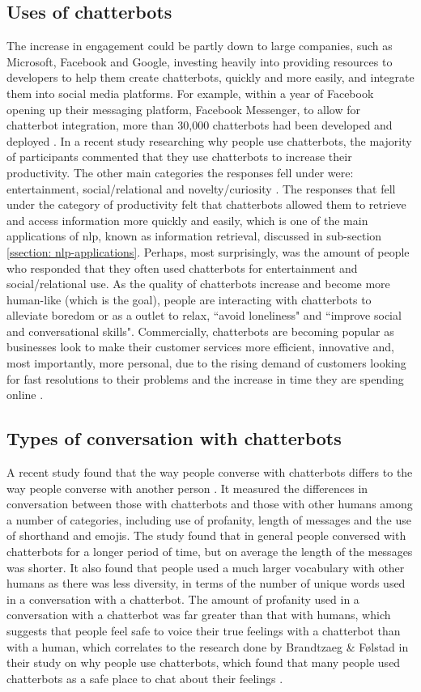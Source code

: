 \subsection{Uses of chatterbots}
The increase in engagement could be partly down to large companies, such as Microsoft, Facebook and Google, investing heavily into providing resources to developers to help them create chatterbots, quickly and more easily, and integrate them into social media platforms. For example, within a year of Facebook opening up their messaging platform, Facebook Messenger, to allow for chatterbot integration, more than 30,000 chatterbots had been developed and deployed \autocite{why-people-use-chatbots2017}. In a recent study researching why people use chatterbots, the majority of participants commented that they use chatterbots to increase their productivity. The other main categories the responses fell under were: entertainment, social/relational and novelty/curiosity \autocite{why-people-use-chatbots2017}. The responses that fell under the category of productivity felt that chatterbots allowed them to retrieve and access information more quickly and easily, which is one of the main applications of \gls{nlp}, known as information retrieval, discussed in sub-section \ref{ssection: nlp-applications}. Perhaps, most surprisingly, was the amount of people who responded that they often used chatterbots for entertainment and social/relational use. As the quality of chatterbots increase and become more human-like (which is the goal), people are interacting with chatterbots to alleviate boredom or as a outlet to relax, ``avoid loneliness" and ``improve social and conversational skills". Commercially, chatterbots are becoming popular as businesses look to make their customer services more efficient, innovative and, most importantly, more personal, due to the rising demand of customers looking for fast resolutions to their problems and the increase in time they are spending online \autocite{deloitte-chatbots2018}.
\subsection{Types of conversation with chatterbots}
A recent study found that the way people converse with chatterbots differs to the way people converse with another person \autocite{hill2015real}. It measured the differences in conversation between those with chatterbots and those with other humans among a number of categories, including use of profanity, length of messages and the use of shorthand and emojis. The study found that in general people conversed with chatterbots for a longer period of time, but on average the length of the messages was shorter. It also found that people used a much larger vocabulary with other humans as there was less diversity, in terms of the number of unique words used in a conversation with a chatterbot. The amount of profanity used in a conversation with a chatterbot was far greater than that with humans, which suggests that people feel safe to voice their true feelings with a chatterbot than with a human, which correlates to the research done by Brandtzaeg \& Følstad in their study on why people use chatterbots, which found that many people used chatterbots as a safe place to chat about their feelings \autocite{why-people-use-chatbots2017}.
